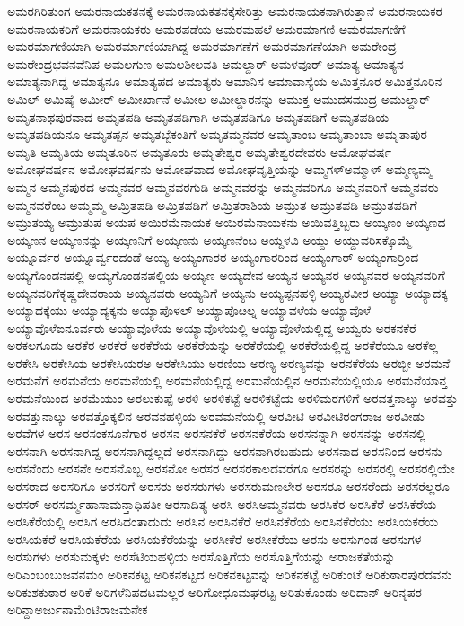 {ಅಮರಗಿರಿತುಂಗ
ಅಮರನಾಯಕತನಕ್ಕೆ
ಅಮರನಾಯಕತನಕ್ಕೆಸೇರಿತ್ತು
ಅಮರನಾಯಕನಾಗಿರುತ್ತಾನೆ
ಅಮರನಾಯಕರ
ಅಮರನಾಯಕರಿಗೆ
ಅಮರನಾಯಕರು
ಅಮರಪಡೆಯ
ಅಮರಮಹಲೆ
ಅಮರಮಾಗಣಿ
ಅಮರಮಾಗಣಿಗೆ
ಅಮರಮಾಗಣಿಯಾಗಿ
ಅಮರಮಾಗಣಿಯಾಗಿದ್ದ
ಅಮರಮಾಗಣೆಗೆ
ಅಮರಮಾಗಣೆಯಾಗಿ
ಅಮರೇಂದ್ರ
ಅಮರೇಂದ್ರಭವನವೆನಿಪ
ಅಮಲಗುಣ
ಅಮಲಶೀಲವತಿ
ಅಮಲ್ದಾರ್
ಅಮಳವೂರ್
ಅಮಾತ್ಯ
ಅಮಾತ್ಯನ
ಅಮಾತ್ಯನಾಗಿದ್ದ
ಅಮಾತ್ಯನೂ
ಅಮಾತ್ಯಪದ
ಅಮಾತ್ಯರು
ಅಮಾನಿಸ
ಅಮಾವಾಸ್ಯೆಯ
ಅಮಿತ್ತನೂರ
ಅಮಿತ್ತನೂರಿನ
ಅಮಿಲ್
ಅಮಿಷೈ
ಅಮೀರ್
ಅಮೀರ್ಖಾನೆ
ಅಮೀಲ
ಅಮೀಲ್ದಾರನನ್ನು
ಅಮುಕ್ತ
ಅಮುದಸಮುದ್ರ
ಅಮುಲ್ದಾರ್
ಅಮೃತನಾಥಪುರವಾದ
ಅಮೃತಪಡಿ
ಅಮೃತಪಡಿಗಾಗಿ
ಅಮೃತಪಡಿಗೂ
ಅಮೃತಪಡಿಗೆ
ಅಮೃತಪಡಿಯ
ಅಮೃತಪಡಿಯನೂ
ಅಮೃತಪ್ಪನ
ಅಮೃತಬ್ಬೆಕಂತಿಗೆ
ಅಮೃತಮ್ಮನವರ
ಅಮೃತಾಂಬ
ಅಮೃತಾಂಬಾ
ಅಮೃತಾಪುರ
ಅಮೃತಿ
ಅಮೃತಿಯ
ಅಮೃತೂರಿನ
ಅಮೃತೂರು
ಅಮೃತೇಶ್ವರ
ಅಮೃತೇಶ್ವರದೇವರು
ಅಮೋಘವರ್ಷ
ಅಮೋಘವರ್ಷನ
ಅಮೋಘವರ್ಷನು
ಅಮೋಘವಾದ
ಅಮೋಘವೃತ್ತಿಯನ್ನು
ಅಮ್ಮಗಳ್ಅಮ್ಮಾಳ್
ಅಮ್ಮಣ್ಯಮ್ಮ
ಅಮ್ಮನ
ಅಮ್ಮನಪುರದ
ಅಮ್ಮನವರ
ಅಮ್ಮನವರಗುಡಿ
ಅಮ್ಮನವರನ್ನು
ಅಮ್ಮನವರಿಗೂ
ಅಮ್ಮನವರಿಗೆ
ಅಮ್ಮನವರು
ಅಮ್ಮನವರೆಂಬ
ಅಮ್ಮಮ್ಮ
ಅಮ್ರಿತಪಡಿ
ಅಮ್ರಿತಪಡಿಗೆ
ಅಮ್ರಿತರಾಶಿಯ
ಅಮ್ರುತ
ಅಮ್ರುತಪಡಿ
ಅಮ್ರುತಪಡಿಗೆ
ಅಮ್ರುತಯ್ಯ
ಅಮ್ರುತುಪ
ಅಯಪ
ಅಯಿರಮೆನಾಯಕ
ಅಯಿರಮೆನಾಯಕನು
ಅಯಿವತ್ತಿಬ್ಬರು
ಅಯ್ಕಣಂ
ಅಯ್ಕಣದ
ಅಯ್ಕಣನ
ಅಯ್ಕಣನನ್ನು
ಅಯ್ಕಣನಿಗೆ
ಅಯ್ಕಣನು
ಅಯ್ಕಣನೆಂಬ
ಅಯ್ದಳವಿ
ಅಯ್ದು
ಅಯ್ದುವರಿಸಕ್ಕೊಮ್ಮೆ
ಅಯ್ನೂರ್ವರ
ಅಯ್ನೂರ್ವ್ವರದಂಡೆ
ಅಯ್ಯ
ಅಯ್ಯಂಗಾರರ
ಅಯ್ಯಂಗಾರರಿಂದ
ಅಯ್ಯಂಗಾರ್
ಅಯ್ಯಂಗಾರ್ರಿಂದ
ಅಯ್ಯಗೊಂಡನಪಲ್ಲಿ
ಅಯ್ಯಗೊಂಡನಪಲ್ಲಿಯ
ಅಯ್ಯಣ
ಅಯ್ಯದೇವ
ಅಯ್ಯನ
ಅಯ್ಯನರ
ಅಯ್ಯನವರ
ಅಯ್ಯನವರಿಗೆ
ಅಯ್ಯನವರಿಗೆಕೃಷ್ಣದೇವರಾಯ
ಅಯ್ಯನವರು
ಅಯ್ಯನಿಗೆ
ಅಯ್ಯನು
ಅಯ್ಯಪ್ಪನಹಳ್ಳಿ
ಅಯ್ಯರವೀರ
ಅಯ್ಯಾ
ಅಯ್ಯಾದಕ್ಕ
ಅಯ್ಯಾದಕ್ಕೆಯು
ಅಯ್ಯಾದ್ಯಕ್ಕನು
ಅಯ್ಯಾಪೊಳಲ್
ಅಯ್ಯಾಪೊೞಲ್ನ
ಅಯ್ಯಾವಳೆಯ
ಅಯ್ಯಾವೊಳೆ
ಅಯ್ಯಾವೊಳೆಐನೂರ್ವರು
ಅಯ್ಯಾವೊಳೆಯ
ಅಯ್ಯಾವೊಳೆಯಲ್ಲಿ
ಅಯ್ಯಾವೊಳೆಯಲ್ಲಿದ್ದ
ಅಯ್ವರು
ಅರಕನಕೆರೆ
ಅರಕಲಗೂಡು
ಅರಕೆರ
ಅರಕೆರೆ
ಅರಕೆರೆಯ
ಅರಕೆರೆಯನ್ನು
ಅರಕೆರೆಯಲ್ಲಿ
ಅರಕೆರೆಯಲ್ಲಿದ್ದ
ಅರಕೆರೆಯೂ
ಅರಕೆಲ್ಲ
ಅರಕೇಸಿ
ಅರಕೇಸಿಯ
ಅರಕೇಸಿಯರಅ
ಅರಕೇಸಿಯು
ಅರಣಿಯ
ಅರಣ್ಯ
ಅರಣ್ಯವನ್ನು
ಅರನಕೆರೆಯ
ಅರಬ್ಬೀ
ಅರಮನೆ
ಅರಮನೆಗೆ
ಅರಮನೆಯ
ಅರಮನೆಯಲ್ಲಿ
ಅರಮನೆಯಲ್ಲಿದ್ದ
ಅರಮನೆಯಲ್ಲಿನ
ಅರಮನೆಯಲ್ಲಿಯೂ
ಅರಮನೆಯಾನ್ತ
ಅರಮನೆಯಿಂದ
ಅರಮೆಯುಂ
ಅರಲುಕುಪ್ಪೆ
ಅರಳಿ
ಅರಳಿಕಟ್ಟೆ
ಅರಳಿಕಟ್ಟೆಯ
ಅರಳಿಮರಗಳಿಗೆ
ಅರವತ್ತನಾಲ್ಕು
ಅರವತ್ತು
ಅರವತ್ತುನಾಲ್ಕು
ಅರವತ್ತೊಕ್ಕಲಿನ
ಅರವನಹಳ್ಳಿಯ
ಅರವಮನೆಯಲ್ಲಿ
ಅರವೀಟಿ
ಅರವೀಟಿರಂಗರಾಜ
ಅರವೀಡು
ಅರವೆಗಳ
ಅರಸ
ಅರಸಂಕಸೂನೆಗಾರ
ಅರಸನ
ಅರಸನಕೆರೆ
ಅರಸನಕೆರೆಯ
ಅರಸನನ್ನಾಗಿ
ಅರಸನನ್ನು
ಅರಸನಲ್ಲಿ
ಅರಸನಾಗಿ
ಅರಸನಾಗಿದ್ದ
ಅರಸನಾಗಿದ್ದಲ್ಲದೆ
ಅರಸನಾಗಿದ್ದು
ಅರಸನಾಗಿರಬಹುದು
ಅರಸನಾದ
ಅರಸನಿಂದ
ಅರಸನು
ಅರಸನೆಂದು
ಅರಸನೇ
ಅರಸನೊಬ್ಬ
ಅರಸನೋ
ಅರಸರ
ಅರಸರಕಾಲದವರೆಗೂ
ಅರಸರನ್ನು
ಅರಸರಲ್ಲಿ
ಅರಸರಲ್ಲಿಯೇ
ಅರಸರಾದ
ಅರಸರಿಗೂ
ಅರಸರಿಗೆ
ಅರಸರು
ಅರಸರುಗಳು
ಅರಸರುಮಣಲೇರ
ಅರಸರೂ
ಅರಸರೆಂದು
ಅರಸರೆಲ್ಲರೂ
ಅರಸರ್
ಅರಸರ್ಮ್ಮಹಾಸಾಮನ್ತಾಧಿಪತೀ
ಅರಸಾದಿತ್ಯ
ಅರಸಿ
ಅರಸಿಅಮ್ಮನವರು
ಅರಸಿಕೆರ
ಅರಸಿಕೆರೆ
ಅರಸಿಕೆರೆಯ
ಅರಸಿಕೆರೆಯಲ್ಲಿ
ಅರಸಿಗ
ಅರಸಿದಂತಾದುದು
ಅರಸಿನ
ಅರಸಿನಕೆರೆ
ಅರಸಿನಕೆರೆಯ
ಅರಸಿನಕೆರೆಯು
ಅರಸಿಯಕರೆಯ
ಅರಸಿಯಕೆರೆ
ಅರಸಿಯಕೆರೆಯ
ಅರಸಿಯಕೆರೆಯನ್ನು
ಅರಸೀಕೆರೆ
ಅರಸೀಕೆರೆಯ
ಅರಸು
ಅರಸುಗಂಡ
ಅರಸುಗಳ
ಅರಸುಗಳು
ಅರಸುಮಕ್ಕಳು
ಅರಸೆಟಿಯಹಳ್ಳಿಯ
ಅರಸೊತ್ತಿಗೆಯ
ಅರಸೊತ್ತಿಗೆಯನ್ನು
ಅರಾಜಕತೆಯನ್ನು
ಅರಿಎಂಬಂಬುಜವನಮಂ
ಅರಿಕನಕಟ್ಟ
ಅರಿಕನಕಟ್ಟದ
ಅರಿಕನಕಟ್ಟವನ್ನು
ಅರಿಕನಕಟ್ಟೆ
ಅರಿಕುಂಟೆ
ಅರಿಕುಠಾರಪುರದವನು
ಅರಿಕುಶಕುಠಾರ
ಅರಿಕೆ
ಅರಿಗಳೆನಿಪದಟಮಲ್ಲರ
ಅರಿಗೋಧೂಮಘರಟ್ಟ
ಅರಿತುಕೊಂಡು
ಅರಿದಾನ್
ಅರಿನೃಪರ
ಅರಿನ್ದಾಅರ್ಜುನಾಮೆಂಟಿರಾಜಮನೇಕ
}

